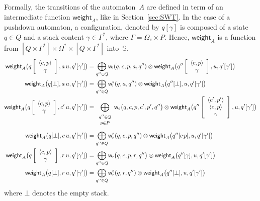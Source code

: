 \documentclass[runningheads]{llncs}
\def\<#1>{\langle #1 \rangle}
\newcommand{\config}[2]{\ensuremath{#1}[{#2}]}
\newcommand{\configup}[2]{\ensuremath{#1}\left[\begin{array}{c} #2 \end{array}\right]}
\def\stacksep{\cdot}
\def\stackup{\\}
\newcommand{\Semiring}{\mathbb{S}}
\def\weight{\mathsf{weight}}
\def\wei{\mathsf{w}}
\newcommand{\call}[1]{\ensuremath #1} %
\newcommand{\return}[1]{\ensuremath #1} %
\def\Omegac{{\Omega_\mathsf{c}}}
\def\weii{{\wei_\mathsf{i}}}
\def\weic{{\wei_\mathsf{c}}}
\def\weir{{\wei_\mathsf{r}}}
\def\weiei{{\wei^\mathsf{e}_\mathsf{i}}}
\def\weiec{{\wei^\mathsf{e}_\mathsf{c}}}
\def\weier{{\wei^\mathsf{e}_\mathsf{r}}}
\begin{document}
Formally, the transitions of the automaton~$A$ are defined
in term of %
an intermediate function $\weight_A$, like in Section~\ref{sec:SWT}.
In the case of a pushdown automaton, a configuration, denoted by $q[\gamma]$ 
is composed of a state $q \in Q$ 
and a stack content $\gamma \in \Gamma^*$, 
where $\Gamma = \Omegac \times P$.
Hence, $\weight_A$ is a function from 
$[Q \times \Gamma^*] \times \Omega^* \times [Q \times \Gamma^*]$ into~$\Semiring$.
%
\begin{align}
\weight_A\bigl(\configup{q}{\<{\call{c}}, p>\stackup\gamma}, a\, u, 
               \config{q'}{\gamma'}\bigr) & =  
 {\displaystyle\bigoplus_{q'' \in Q}} \weii(q, c, p, a, q'') 
  \otimes \weight_A\bigl(\configup{q''}{\<{\call{c}}, p> \stackup \gamma}, u, 
                         \config{q'}{\gamma'}\bigr)\nonumber\\
\weight_A\bigl(\config{q}{\bot}, a\, u, 
               \config{q'}{\gamma'}\bigr) & =  
  {\displaystyle\bigoplus_{q'' \in Q}} \weiei(q, a, q'') 
   \otimes \weight_A\bigl(\config{q''}{\bot}, u, \config{q'}{\gamma'}\bigr)\nonumber\\
%
\weight_A\bigl(\configup{q}{\<{\call{c}}, p>\stackup\gamma}, {\call{c}'}\, u, 
               \config{q'}{\gamma'}\bigr) & =  
 {\displaystyle\bigoplus_{\begin{array}{c}
                          \scriptstyle q'' \in Q\\[-2pt]
                          \scriptstyle p \in P
                          \end{array}}}
 \weic\bigl(q, {\call{c}}, p, {\call{c}'}, p', q''\bigr) 
 \otimes \weight_A\bigl(\configup{q''}{\<{\call{c}'}, p'>\stackup \<{\call{c}}, p>\stackup \gamma}, u, 
                        \config{q'}{\gamma'}\bigr)\nonumber\\[1mm]
%
\weight_A\bigl(\config{q}{\bot}, {\call{c}}\, u, 
               \config{q'}{\gamma'}\bigr) & =  
 {\displaystyle\bigoplus_{q'' \in Q}} \weiec(q, {\call{c}}, p, q'') 
  \otimes \weight_A\bigl(\config{q''}{{\call{c}}\, p}, u, 
                         \config{q'}{\gamma'}\bigr)\nonumber\\
%
\weight_A\bigl(\configup{q}{\<{\call{c}}, p>\stackup \gamma}, {\return{r}}\, u, 
               \config{q'}{\gamma'}\bigr) & =  
 {\displaystyle\bigoplus_{q'' \in Q}} 
  \weir\bigl(q, {\call{c}}, p, {\return{r}}, q''\bigr) 
  \otimes \weight_A\bigl(\config{q''}{\gamma}, u, 
                         \config{q'}{\gamma'}\bigr)\nonumber\\
%
\weight_A\bigl(\config{q}{\bot}, {\return{r}}\, u, 
               \config{q'}{\gamma'}\bigr) & =  
 {\displaystyle\bigoplus_{q'' \in Q}} \weier(q, {\return{r}}, q'') 
  \otimes \weight_A\bigl(\config{q''}{\bot}, u, 
                         \config{q'}{\gamma'}\bigr)
\label{eq:SWVPA-weight}
\end{align}
%
where $\bot$ denotes the empty stack.
\end{document}
